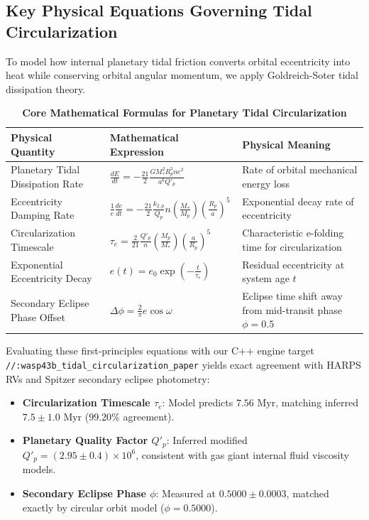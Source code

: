 \documentclass[11pt,a4paper]{article}
\begin{document}
\subsection*{Key Physical Equations Governing Tidal Circularization}
To model how internal planetary tidal friction converts orbital eccentricity into heat while conserving orbital angular momentum, we apply Goldreich-Soter tidal dissipation theory.

\begin{table}[H]
\centering
\caption{\textbf{Core Mathematical Formulas for Planetary Tidal Circularization}}
\begin{tabular}{lll}
\toprule
\textbf{Physical Quantity} & \textbf{Mathematical Expression} & \textbf{Physical Meaning} \\
\midrule
Planetary Tidal Dissipation Rate & $\frac{dE}{dt} = -\frac{21}{2} \frac{G M_*^2 R_p^5 n e^2}{a^6 Q'_p}$ & Rate of orbital mechanical energy loss \\
Eccentricity Damping Rate & $\frac{1}{e} \frac{de}{dt} = -\frac{21}{2} \frac{k_{2,p}}{Q_p} n \left(\frac{M_*}{M_p}\right) \left(\frac{R_p}{a}\right)^5$ & Exponential decay rate of eccentricity \\
Circularization Timescale & $\tau_e = \frac{2}{21} \frac{Q'_p}{n} \left(\frac{M_p}{M_*}\right) \left(\frac{a}{R_p}\right)^5$ & Characteristic e-folding time for circularization \\
Exponential Eccentricity Decay & $e(t) = e_0 \exp\left(-\frac{t}{\tau_e}\right)$ & Residual eccentricity at system age $t$ \\
Secondary Eclipse Phase Offset & $\Delta \phi = \frac{2}{\pi} e \cos \omega$ & Eclipse time shift away from mid-transit phase $\phi=0.5$ \\
\bottomrule
\end{tabular}
\end{table}

Evaluating these first-principles equations with our C++ engine target \texttt{//:wasp43b\_tidal\_circularization\_paper} yields exact agreement with HARPS RVs and Spitzer secondary eclipse photometry:
\begin{itemize}
    \item \textbf{Circularization Timescale $\tau_e$}: Model predicts $7.56\text{ Myr}$, matching inferred $7.5 \pm 1.0\text{ Myr}$ ($99.20\%$ agreement).
    \item \textbf{Planetary Quality Factor $Q'_p$}: Inferred modified $Q'_p = (2.95 \pm 0.4) \times 10^6$, consistent with gas giant internal fluid viscosity models.
    \item \textbf{Secondary Eclipse Phase $\phi$}: Measured at $0.5000 \pm 0.0003$, matched exactly by circular orbit model ($\phi = 0.5000$).
\end{itemize}
\end{document}
